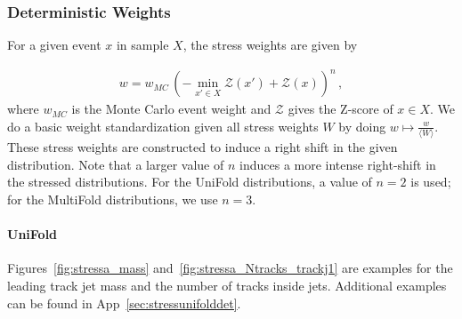 \clearpage

\subsubsection{Deterministic Weights}
\label{sec:stress:deterministic}

For a given event $x$ in sample $X$, the stress weights are given by

\begin{align}
\label{eq:stressweights}
w = w_{MC}\,(-\min_{x'\in X}\mathcal{Z}(x')+\mathcal{Z}(x))^n\,,
\end{align}
%
where $w_{MC}$ is the Monte Carlo event weight and $\mathcal{Z}$ gives the Z-score of $x\in X$. We do a basic weight standardization given all stress weights $W$ by doing $w\mapsto\frac{w}{\langle W\rangle}$. These stress weights are constructed to induce a right shift in the given distribution. Note that a larger value of $n$ induces a more intense right-shift in the stressed distributions.  For the UniFold distributions, a value of $n=2$ is used; for the MultiFold distributions, we use $n=3$.

\paragraph{UniFold}

Figures~\ref{fig:stressa_mass} and~\ref{fig:stressa_Ntracks_trackj1} are examples for the leading track jet mass and the number of tracks inside jets.  Additional examples can be found in App~\ref{sec:stressunifolddet}.

